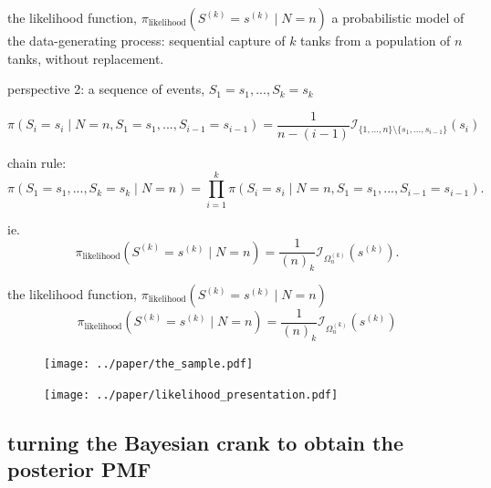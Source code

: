 \documentclass[10pt]{beamer}
\begin{document}
\begin{frame}[t]{the likelihood function, $\pi_{\text{likelihood}}(S^{(k)}=s^{(k)} \mid N=n)$}
\alert{a probabilistic model of the data-generating process}: sequential capture of $k$ tanks from a population of $n$ tanks, without replacement.


\begin{exampleblock}{perspective 2: a sequence of events, $S_1=s_1, ..., S_k=s_k$}
\pause 

	\begin{equation*}
		\pi (S_i=s_i \mid N=n, S_1=s_1, ..., S_{i-1}=s_{i-1})=\dfrac{1}{n-(i-1)} \mathcal{I}_{ \{1,...,n\} \setminus \{s_1, ..., s_{i-1}\}}(s_i)
	\end{equation*}

\pause chain rule:
\begin{equation*}
	\pi(S_1=s_1, ..., S_k=s_k \mid N=n) = \displaystyle \prod_{i=1}^k \pi (S_i=s_i \mid N=n, S_1=s_1,...,S_{i-1}=s_{i-1}).
\end{equation*}

\pause ie.
\begin{equation*}
	\pi_{\text{likelihood}}(S^{(k)}=s^{(k)} \mid N=n)=
	\dfrac{1}{(n)_k} \mathcal{I}_{\Omega_n^{(k)}}\left(s^{(k)}\right).
\end{equation*}

\end{exampleblock}
\end{frame}

\begin{frame}[t]{the likelihood function, $\pi_{\text{likelihood}}(S^{(k)}=s^{(k)} \mid N=n)$}
\begin{equation*}
	\pi_{\text{likelihood}}(S^{(k)}=s^{(k)} \mid N=n)=
	\dfrac{1}{(n)_k} \mathcal{I}_{\Omega_n^{(k)}}\left(s^{(k)}\right)
\end{equation*}

\begin{figure}[h!]
	\centering
	\texttt{[image: ../paper/the\_sample.pdf]}
	
	\texttt{[image: ../paper/likelihood\_presentation.pdf]}
\end{figure}
\end{frame}

\subsection{turning the Bayesian crank to obtain the posterior PMF}
\end{document}
